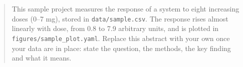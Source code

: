 \begin{abstract}

This sample project measures the response of a system to eight increasing doses (0--7 mg), stored in \texttt{data/sample.csv}.
The response rises almost linearly with dose, from 0.8 to 7.9 arbitrary units, and is plotted in \texttt{figures/sample\_plot.yaml}.
Replace this abstract with your own once your data are in place: state the question, the methods, the key finding and what it means.

\vspace{1em}
\end{abstract}

